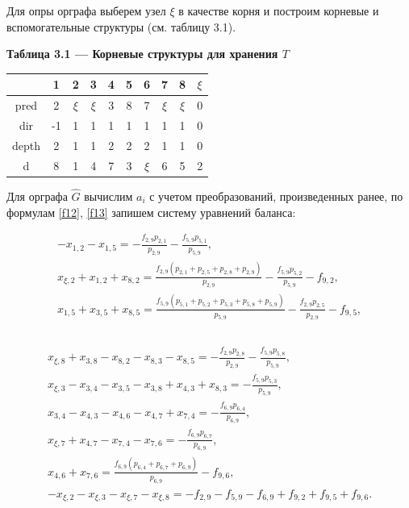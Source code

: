 \documentclass[14pt]{extarticle}%
\begin{document}
Для опры орграфа выберем узел $\xi$ в качестве корня и построим корневые и вспомогательные структуры (см. таблицу 3.1).

\begin{center}
\textbf{Таблица 3.1 --- Корневые структуры для хранения $T$}\\
\begin{tabular}{c|ccccccccc}
  &1&2&3&4&5&6&7&8&$\xi$\\\hline
 pred&2 & $\xi$ & $\xi$ & 3 & 8 & 7 & $\xi$ & $\xi$ & 0 \\
 dir& -1 & 1 & 1 & 1 & 1 & 1 & 1 & 1 & 0 \\
 depth&2 & 1 & 1 & 2 & 2 & 2 & 1 & 1 & 0 \\
 d&8 & 1 & 4 & 7 & 3 & $\xi$ & 6 & 5 & 2 \\
\end{tabular}
\end{center}

Для орграфа $\widehat{G}$ вычислим $a_i$ с учетом преобразований, произведенных ранее, по формулам \eqref{f12}, \eqref{f13} запишем систему уравнений баланса:

\begin{equation*}\begin{gathered}
	    -x_{1,2}-x_{1,5}=-\frac{f_{2,9} p_{2,1}}{p_{2,9}}-\frac{f_{5,9} p_{5,1}}{p_{5,9}},\\
    x_{\xi ,2}+x_{1,2}+x_{8,2}=\frac{f_{2,9} \left(p_{2,1}+p_{2,5}+p_{2,8}+p_{2,9}\right)}{p_{2,9}}-\frac{f_{5,9} p_{5,2}}{p_{5,9}}-f_{9,2},\\
    x_{1,5}+x_{3,5}+x_{8,5}=\frac{f_{5,9} \left(p_{5,1}+p_{5,2}+p_{5,3}+p_{5,8}+p_{5,9}\right)}{p_{5,9}}-\frac{f_{2,9} p_{2,5}}{p_{2,9}}-f_{9,5},\\
    \end{gathered}
    \end{equation*}\\
    \begin{equation}\label{f3.1.1}
    \begin{gathered}
    x_{\xi ,8}+x_{3,8}-x_{8,2}-x_{8,3}-x_{8,5}=-\frac{f_{2,9} p_{2,8}}{p_{2,9}}-\frac{f_{5,9} p_{5,8}}{p_{5,9}},\\
    x_{\xi ,3}-x_{3,4}-x_{3,5}-x_{3,8}+x_{4,3}+x_{8,3}=-\frac{f_{5,9} p_{5,3}}{p_{5,9}},\\
    x_{3,4}-x_{4,3}-x_{4,6}-x_{4,7}+x_{7,4}=-\frac{f_{6,9} p_{6,4}}{p_{6,9}},\\
    x_{\xi ,7}+x_{4,7}-x_{7,4}-x_{7,6}=-\frac{f_{6,9} p_{6,7}}{p_{6,9}},\\
    x_{4,6}+x_{7,6}=\frac{f_{6,9} \left(p_{6,4}+p_{6,7}+p_{6,9}\right)}{p_{6,9}}-f_{9,6},\\
    -x_{\xi ,2}-x_{\xi ,3}-x_{\xi ,7}-x_{\xi ,8}=-f_{2,9}-f_{5,9}-f_{6,9}+f_{9,2}+f_{9,5}+f_{9,6}.
    \end{gathered}
\end{equation}
\end{document}
